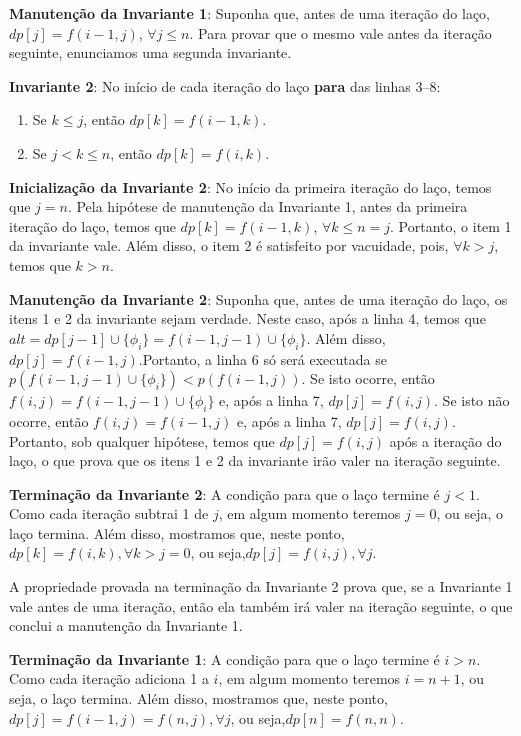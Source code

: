 \textbf{Manutenção da Invariante 1}: Suponha que, antes de uma iteração do laço,\break $dp[j] = f(i-1,j)$, $\forall j \leq n$. Para provar que o mesmo vale antes da iteração seguinte, enunciamos uma segunda invariante.

\textbf{Invariante 2}: No início de cada iteração do laço \textbf{para} das linhas 3--8:
\begin{enumerate}
	\item Se $k \leq j$, então $dp[k] = f(i-1,k)$.
	\item Se $j < k \leq n$, então $dp[k] = f(i,k)$.
\end{enumerate}

\textbf{Inicialização da Invariante 2}: No início da primeira iteração do laço, temos que $j = n$. Pela hipótese de manutenção da Invariante 1, antes da primeira iteração do laço, temos que $dp[k] = f(i-1,k)$, $\forall k \leq n = j$. Portanto, o item 1 da invariante vale. Além disso, o item 2 é satisfeito por vacuidade, pois, $\forall k > j$, temos que $k > n$.

\textbf{Manutenção da Invariante 2}: Suponha que, antes de uma iteração do laço, os itens 1 e 2 da invariante sejam verdade. Neste caso, após a linha 4, temos que\break $alt = dp[j-1] \cup \{\phi_i \} = f(i-1,j-1) \cup \{\phi_i \}$. Além disso, $dp[j] = f(i-1,j)$.\break Portanto, a linha 6 só será executada se $p(f(i-1,j-1) \cup \{\phi_i \}) < p(f(i-1,j))$. Se isto ocorre, então $f(i,j) = f(i-1,j-1) \cup \{\phi_i \}$ e, após a linha 7, $dp[j] = f(i,j)$. Se isto não ocorre, então $f(i,j) = f(i-1,j)$ e, após a linha 7, $dp[j] = f(i,j)$. Portanto, sob qualquer hipótese, temos que $dp[j] = f(i,j)$ após a iteração do laço, o que prova que os itens 1 e 2 da invariante irão valer na iteração seguinte.

\textbf{Terminação da Invariante 2}: A condição para que o laço termine é $j < 1$. Como cada iteração subtrai 1 de $j$, em algum momento teremos $j = 0$, ou seja, o laço termina. Além disso, mostramos que, neste ponto, $dp[k] = f(i,k), \forall k > j = 0$, ou seja,\break $dp[j] = f(i,j), \forall j$.

A propriedade provada na terminação da Invariante 2 prova que, se a Invariante 1 vale antes de uma iteração, então ela também irá valer na iteração seguinte, o que conclui a manutenção da Invariante 1.

\textbf{Terminação da Invariante 1}: A condição para que o laço termine é $i > n$. Como cada iteração adiciona 1 a $i$, em algum momento teremos $i = n+1$, ou seja, o laço termina. Além disso, mostramos que, neste ponto, $dp[j] = f(i-1,j) = f(n,j), \forall j$, ou seja,\break $dp[n] = f(n,n)$.

